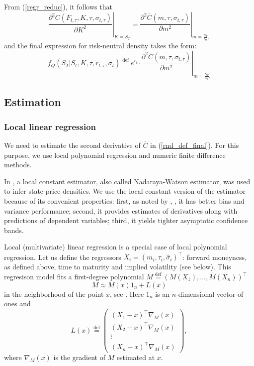 \documentclass[a4paper,12pt]{article}
\theoremstyle{plain}
\theoremstyle{definition}
\begin{document}
From (\ref{regr_reduc}), it follows that
\begin{equation}
\left. \frac{\partial^2 C(F_{t,\tau}, K, \tau, \sigma_{t,\tau})}{\partial K^2} \right|_{K = S_T} = \left. \frac{\partial^2 \overline{C} (m, \tau, \sigma_{t,\tau})}{\partial m^2} \right|_{m = \frac{S_T}{S_t},}
\label{deriv_change}
\end{equation}
and the final expression for risk-neutral density takes the form:
\begin{equation}
f_Q(S_T | S_t, K, \tau, r_{t,\tau}, \sigma_t) \stackrel{\operatorname{def}}{=} \left. e^{r_{t,\tau}} \frac{\partial^2 \overline{C} (m, \tau, \sigma_{t,\tau})}{\partial m^2} \right|_{m = \frac{S_T}{S_t}.}
\label{rnd_def_final}
\end{equation}

\subsection{Estimation}
\subsubsection{Local linear regression}
We need to estimate the second derivative of $\overline{C}$ in (\ref{rnd_def_final}). For this purpose, we use local polynomial regression and numeric finite difference methods.

In \citet{ait_sahalia_lo_1}, a local constant estimator, also called Nadaraya-Watson estimator, was used to infer state-price densities. We use the local constant version of the estimator because of its convenient properties: first, as noted by \citet{li_racine}, \citet{song_xiu}, it has better bias and variance performance; second, it provides estimates of derivatives along with predictions of dependent variables; third, it yields tighter asymptotic confidence bands.

Local (multivariate) linear regression is a special case of local polynomial regression. Let us define the regressors $X_i = (m_i, \tau_i, \widehat{\sigma}_i)^{\top}$: forward moneyness, as defined above, time to maturity and implied volatility (see below). This regresison model fits a first-degree polynomial $M \stackrel{\operatorname{def}}{=} (M(X_1),\ldots,M(X_n))^{\top}$
\begin{equation}
M \approx M(x) 1_n + L(x)
\label{taylor_exp}
\end{equation}
in the neighborhood of the point $x$, see \citet{haerdle_et_al}. Here $1_n$ is an $n$-dimensional vector of ones and 
\begin{equation}
L(x) \stackrel{\operatorname{def}}{=} \left(\begin{array}{c}
	   (X_1 - x)^{\top} \nabla_M(x) \\
	   (X_2 - x)^{\top} \nabla_M(x) \\
	   \vdots \\
	   (X_n - x)^{\top} \nabla_M(x)
	   \end{array} \right),
\end{equation}
where $\nabla_M(x)$ is the gradient of $M$ estimated at $x$.
\end{document}
